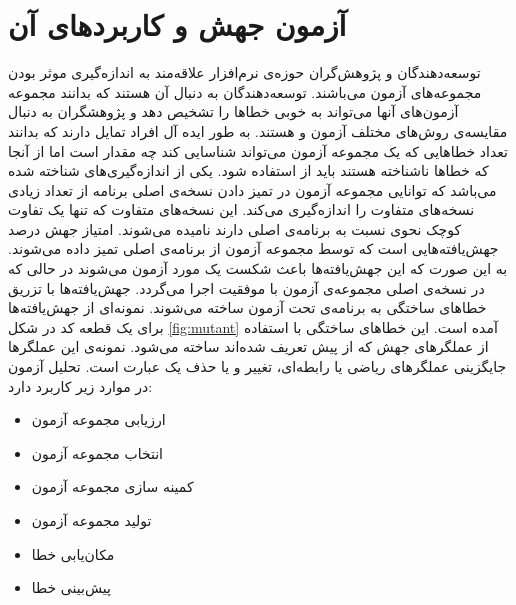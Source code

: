 
\section{آزمون جهش و کاربردهای آن}
توسعه‌دهندگان و پژوهش‌گران حوزه‌ی نرم‌افزار علاقه‌مند به اندازه‌گیری موثر بودن مجموعه‌های آزمون می‌باشند. توسعه‌دهندگان به دنبال آن هستند که بدانند مجموعه آزمون‌های آنها می‌تواند به خوبی خطاها را تشخیص دهد و پژوهشگران به دنبال مقایسه‌ی روش‌های مختلف آزمون و   هستند. به طور ایده آل افراد تمایل دارند که بدانند تعداد خطاهایی که یک مجموعه آزمون می‌تواند شناسایی کند چه مقدار است اما از آنجا که خطاها ناشناخته هستند باید از  استفاده شود. یکی از اندازه‌‌‌گیری‌های شناخته شده  می‌باشد که توانایی مجموعه آزمون در تمیز دادن نسخه‌ی اصلی برنامه از تعداد زیادی نسخه‌های متفاوت را اندازه‌گیری می‌کند. این نسخه‌های متفاوت که تنها یک تفاوت کوچک نحوی نسبت به برنامه‌ی اصلی دارند  نامیده می‌شوند. امتیاز جهش درصد جهش‌یافته‌هایی  است که توسط مجموعه آزمون از برنامه‌ی اصلی تمیز داده می‌شوند. به این صورت که این جهش‌یافته‌ها باعث شکست یک مورد آزمون می‌شوند در حالی که در نسخه‌ی اصلی مجموعه‌ی آزمون با موفقیت اجرا می‌گردد. جهش‌یافته‌ها با تزریق خطاهای ساختگی به برنامه‌ی تحت آزمون  ساخته می‌شوند.  نمونه‌ای از  جهش‌یافته‌ها  برای یک قطعه کد در شکل \ref{fig:mutant} آمده است. این خطاهای ساختگی با استفاده از عملگرهای جهش که از پیش تعریف شده‌اند ساخته می‌شود. نمونه‌ی این عملگرها جایگزینی عملگرهای ریاضی یا رابطه‌ای، تغییر  و یا حذف یک عبارت است\cite{just2014mutants}. تحلیل آزمون در موارد زیر کاربرد دارد:
\begin{itemize}
	\setlength\itemsep{.01em}	
	\item 
	ارزیابی مجموعه آزمون
	\item 
	انتخاب مجموعه آزمون
	\item 
	 کمینه سازی مجموعه آزمون
	\item 
	 تولید مجموعه آزمون
	\item 
	مکان‌یابی خطا
	\item 
	پیش‌بینی خطا
\end{itemize}

